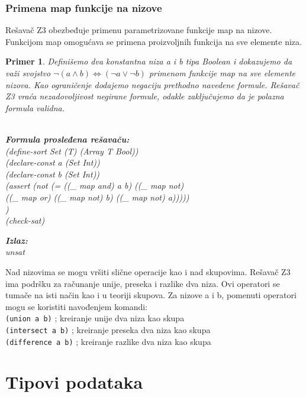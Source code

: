 \documentclass[12pt,oneside]{memoir}
\newcommand\tab[1][0.5cm]{\hspace*{#1}}
\newtheorem{primer}{Primer}
\begin{document}
\subsubsection{Primena map funkcije na nizove}
Rešavač Z3 obezbeđuje primenu parametrizovane funkcije map na nizove. Funkcijom map omogućava se primena proizvoljnih funkcija na sve elemente niza.
\begin{primer} Definišemo dva konstantna niza a i b tipa Boolean i dokazujemo da važi svojstvo $\neg{(a \land b)} \Leftrightarrow (\neg{a} \lor \neg{b}) $ primenom funkcije map na sve elemente nizova. Kao ograničenje dodajemo negaciju prethodno navedene formule. Rešavač Z3 vraća nezadovoljivost negirane formule, odakle zaključujemo da je polazna formula validna.\\ \\
\begin{minipage}[b]{0.65\textwidth}
\textbf{Formula prosleđena rešavaču:}
\\(define-sort Set (T) (Array T Bool))
\\(declare-const a (Set Int))
\\(declare-const b (Set Int))
\\(assert (not (= ((\_ map and) a b) ((\_ map not) 
\\\tab((\_ map or) ((\_ map not) b) ((\_ map not) a)))))
\\)
\\(check-sat)
\end{minipage}
\hspace{2.5cm} 
\begin{minipage}[t]{0.5\textwidth}
\vspace{-4.65cm}
\textbf{Izlaz:}
\\unsat 
\end{minipage}
\end{primer}

Nad nizovima se mogu vršiti slične operacije kao i nad skupovima. Rešavač Z3 ima podršku za računanje unije, preseka i razlike dva niza. Ovi operatori se tumače na isti način kao i u teoriji skupova. Za nizove a i b, pomenuti operatori mogu se koristiti navođenjem komandi:\\
\texttt{(union a b)} ; kreiranje unije dva niza kao skupa \\
\texttt{(intersect a b)} ; kreiranje preseka dva niza kao skupa \\
\texttt{(difference a b)} ; kreiranje razlike dva niza kao skupa
\section{Tipovi podataka} \label{sec:num3}
\end{document}
